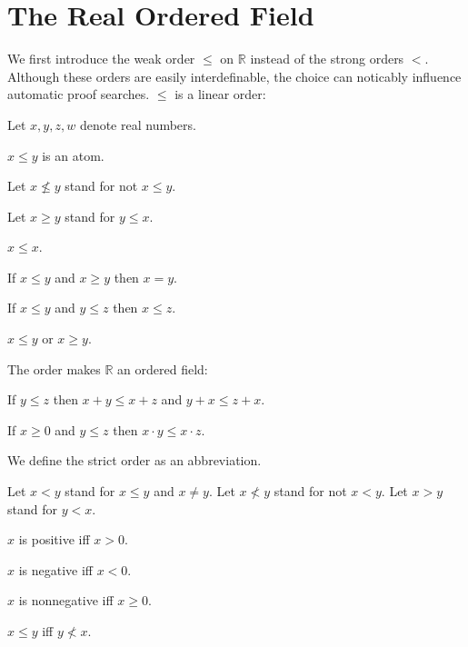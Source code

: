 \documentclass{article}
\begin{document}
\section{The Real Ordered Field}

We first introduce the weak order $\leq$ on $\mathbb{R}$
instead of
the strong orders $<$. Although these orders are easily
interdefinable, the choice can noticably influence automatic
proof searches. $\leq$ is a linear order:

\begin{forthel}
Let $x,y,z,w$ denote real numbers.

\begin{signature}
$x \leq y$ is an atom.
\end{signature}


Let $x \nleq y$ stand for not $x \leq y$.

Let $x \geq y$ stand for $y \leq x$.

\begin{axiom}
$x \leq x$.
\end{axiom}

\begin{axiom}
If $x \leq y$ and $x \geq y$ then $x=y$.
\end{axiom}

\begin{axiom}
If $x \leq y$ and $y \leq z$ then $x \leq z$.
\end{axiom}

\begin{axiom}
$x \leq y$ or $x \geq y$.
\end{axiom}

\end{forthel}
The order makes $\mathbb{R}$ an ordered field:
\begin{forthel}
\begin{axiom}
If $y \leq z$ then $x + y \leq x + z$ and $y + x \leq z + x$.
\end{axiom}

\begin{axiom}[1 17 ii]
If $x \geq 0$ and $y \leq z$ then $x \cdot y \leq x \cdot z$.
\end{axiom}
\end{forthel}
We define the strict order as an abbreviation.
\begin{forthel}
Let $x < y$ stand for $x \leq y$ and $x \neq y$.
Let $x \nless y$ stand for not $x < y$.
Let $x > y$ stand for $y < x$.

\begin{definition}
$x$ is positive iff $x > 0$.
\end{definition}

\begin{definition}
$x$ is negative iff $x < 0$.
\end{definition}

\begin{definition}
$x$ is nonnegative iff $x \geq 0$.
\end{definition}

\begin{lemma}
$x \leq y$ iff $y \nless x$.
\end{lemma}
\end{forthel}
\end{document}
